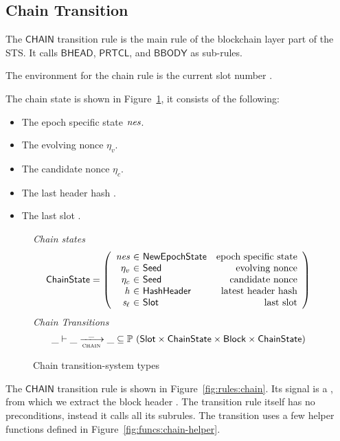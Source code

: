 \subsection{Chain Transition}
\label{sec:chain-trans}

The $\mathsf{CHAIN}$ transition rule is the main rule of the blockchain layer
part of the STS. It calls $\mathsf{BHEAD}$, $\mathsf{PRTCL}$, and $\mathsf{BBODY}$ as sub-rules.

The environment for the chain rule is the current slot number .

The chain state is shown in Figure~\ref{fig:ts-types:chain}, it consists of the
following:

\begin{itemize}
  \item The epoch specific state $\mathit{nes}$.
  \item The evolving nonce $\eta_v$.
  \item The candidate nonce $\eta_c$.
  \item The last header hash .
  \item The last slot .
\end{itemize}

\begin{figure}
  \emph{Chain states}
  \begin{equation*}
    \ChainState =
    \left(
      \begin{array}{r@{~\in~}lr}
        \var{nes} & \NewEpochState & \text{epoch specific state} \\
        ~\eta_v & \Seed & \text{evolving nonce} \\
        ~\eta_c & \Seed & \text{candidate nonce} \\
        \var{h} & \HashHeader & \text{latest header hash} \\
        \var{s_\ell} & \Slot & \text{last slot} \\
      \end{array}
    \right)
  \end{equation*}
  \emph{Chain Transitions}
  \begin{equation*}
    \_ \vdash \var{\_} \trans{chain}{\_} \var{\_} \subseteq
    \powerset (\Slot \times \ChainState \times \Block \times \ChainState)
  \end{equation*}
  \caption{Chain transition-system types}
  \label{fig:ts-types:chain}
\end{figure}

The $\mathsf{CHAIN}$ transition rule is shown in
Figure~\ref{fig:rules:chain}. Its signal is a , from which
we extract the block header .
The transition rule itself has no preconditions, instead it calls all its subrules.
The transition uses a few helper functions defined in Figure~\ref{fig:funcs:chain-helper}.

